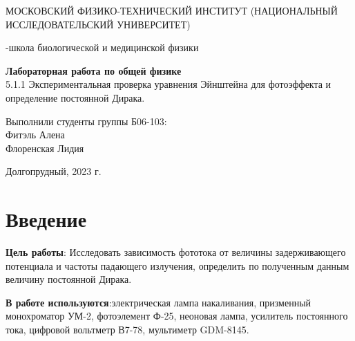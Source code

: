 \documentclass[a4paper,12pt]{article}
\begin{document}
\def\figurename{Рисунок}
\begin{titlepage}
\begin{center}
    {\large МОСКОВСКИЙ ФИЗИКО-ТЕХНИЧЕСКИЙ ИНСТИТУТ (НАЦИОНАЛЬНЫЙ ИССЛЕДОВАТЕЛЬСКИЙ УНИВЕРСИТЕТ)}
\end{center}
\begin{center}
    {-школа биологической и медицинской физики}
\end{center}

\vspace{1cm}
{\huge
\begin{center}
    {\bf Лабораторная работа по общей физике}\\
    \vspace{0.5cm}
    5.1.1 Экспериментальная проверка уравнения Эйнштейна для фотоэффекта и определение постоянной Дирака.
\end{center}
}

\vspace{4cm}
\begin{flushright}
{\LARGE Выполнили студенты группы Б06-103:\\ Фитэль Алена \\Флоренская Лидия\\}

\end{flushright}
\vspace{9cm}
\begin{center}
    Долгопрудный, 2023 г.
\end{center}
\end{titlepage}








\newpage
\section{Введение}

\textbf{Цель работы}: Исследовать зависимость фототока от величины задерживающего потенциала и частоты падающего излучения, определить по полученным данным величину постоянной Дирака.

\textbf{В работе используются}:электрическая лампа накаливания, призменный монохроматор УМ-2, фотоэлемент Ф-25, неоновая лампа, усилитель постоянного тока, цифровой вольтметр В7-78, мультиметр GDM-8145.
\end{document}
